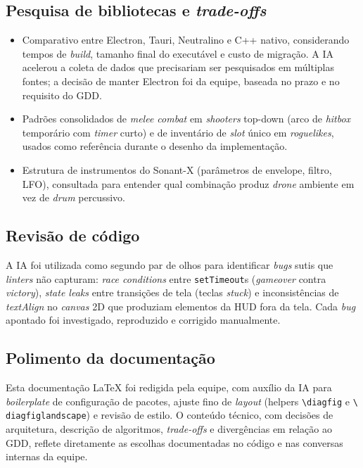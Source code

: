 \subsection{Pesquisa de bibliotecas e \emph{trade-offs}}

\begin{itemize}
  \item Comparativo entre Electron, Tauri, Neutralino e C++ nativo, considerando
    tempos de \emph{build}, tamanho final do executável e custo de migração. A IA
    acelerou a coleta de dados que precisariam ser pesquisados em múltiplas
    fontes; a decisão de manter Electron foi da equipe, baseada no prazo e no
    requisito do GDD.
  \item Padrões consolidados de \emph{melee combat} em \emph{shooters} top-down
    (arco de \emph{hitbox} temporário com \emph{timer} curto) e de inventário
    de \emph{slot} único em \emph{roguelikes}, usados como referência durante o
    desenho da implementação.
  \item Estrutura de instrumentos do Sonant-X (parâmetros de envelope, filtro,
    LFO), consultada para entender qual combinação produz \emph{drone} ambiente
    em vez de \emph{drum} percussivo.
\end{itemize}

\subsection{Revisão de código}

A IA foi utilizada como segundo par de olhos para identificar \emph{bugs} sutis
que \emph{linters} não capturam: \emph{race conditions} entre
\texttt{setTimeout}s (\emph{gameover} contra \emph{victory}), \emph{state
leaks} entre transições de tela (teclas \emph{stuck}) e inconsistências de
\emph{textAlign} no \emph{canvas} 2D que produziam elementos da HUD fora da
tela. Cada \emph{bug} apontado foi investigado, reproduzido e corrigido
manualmente.

\subsection{Polimento da documentação}

Esta documentação \LaTeX{} foi redigida pela equipe, com auxílio da IA para
\emph{boilerplate} de configuração de pacotes, ajuste fino de \emph{layout}
(helpers \texttt{\textbackslash diagfig} e \texttt{\textbackslash
diagfiglandscape}) e revisão de estilo. O conteúdo técnico, com decisões de
arquitetura, descrição de algoritmos, \emph{trade-offs} e divergências em
relação ao GDD, reflete diretamente as escolhas documentadas no código e nas
conversas internas da equipe.


